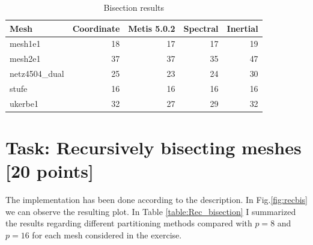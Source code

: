 \documentclass[unicode,11pt,a4paper,oneside,numbers=endperiod,openany]{scrartcl}
\begin{document}
\begin{table}[h]
\caption{Bisection results}
\centering
\begin{tabular}{|l|r|r|r|r|} \hline\hline 
Mesh             &  Coordinate           & Metis 5.0.2  & Spectral & Inertial  \\ \hline
mesh1e1          &   18                  &   17         &  17      &  19       \\             
mesh2e1          &   37                  &   37         &  35      &  47       \\ 
netz4504\_dual   &   25                  &   23         &  24      &  30       \\ 
stufe            &   16                  &   16         &  16      &  16       \\
ukerbe1          &   32                  &   27         &  29      &  32       \\
\hline \hline
\end{tabular}
\label{table:bisection}
\end{table}



\section{Task: Recursively bisecting meshes [20 points]}
The implementation has been done according to the description. In Fig.\ref{fig:recbis} we can observe the resulting plot. In Table \ref{table:Rec_bisection} I summarized the results regarding different partitioning methods compared with $p=8$ and $p=16$ for each mesh considered in the exercise.  
\end{document}
